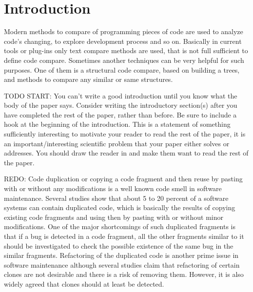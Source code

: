 \documentclass{report}
\begin{document}



\newpage
{}
\onehalfspacing
\large

\chapter{Introduction}

Modern methods to compare of programming pieces of code are used to analyze code's changing, to explore development process and so on. Basically in current tools or plug-ins only text compare methods are used, that is not full sufficient to define code compare.
Sometimes another techniques can be very helpful for such purposes. One of them is a structural code compare, based on building a trees, and methods to compare any similar or same structures. 

TODO START:
You can't write a good introduction until you know what the body of the paper says. Consider writing the introductory section(s) after you have completed the rest of the paper, rather than before.
Be sure to include a hook at the beginning of the introduction. This is a statement of something sufficiently interesting to motivate your reader to read the rest of the paper, it is an important/interesting scientific problem that your paper either solves or addresses. You should draw the reader in and make them want to read the rest of the paper. 

REDO:
Code duplication or copying a code fragment and then reuse by pasting with or
without any modifications is a well known code smell in software maintenance. Several
studies show that about 5 to 20 percent of a software systems can contain duplicated code,
which is basically the results of copying existing code fragments and using then by
pasting with or without minor modifications. One of the major shortcomings of such
duplicated fragments is that if a bug is detected in a code fragment, all the other
fragments similar to it should be investigated to check the possible existence of the
same bug in the similar fragments. Refactoring of the duplicated code is another prime
issue in software maintenance although several studies claim that refactoring of certain
clones are not desirable and there is a risk of removing them. However, it is also widely
agreed that clones should at least be detected.
\end{document}
